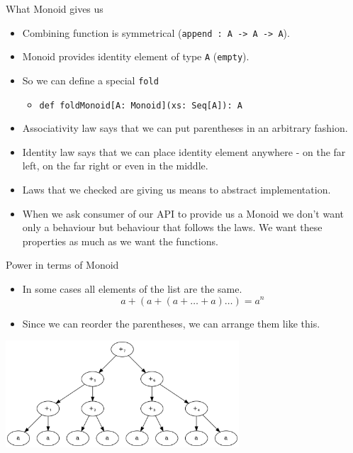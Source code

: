 \documentclass[presentation,aspectratio=169,smaller]{beamer}
\begin{document}
\begin{frame}[label={sec:org7111aef},fragile]{What Monoid gives us}
 \begin{itemize}
\item Combining function is symmetrical (\texttt{append : A -> A -> A}).
\item Monoid provides identity element of type \texttt{A} (\texttt{empty}).
\item So we can define a special \texttt{fold}
\begin{itemize}
\item \texttt{def foldMonoid[A: Monoid](xs: Seq[A]): A}
\end{itemize}
\item Associativity law says that we can put parentheses in an arbitrary fashion.
\item Identity law says that we can place identity element anywhere - on the far
left, on the far right or even in the middle.
\item Laws that we checked are giving us means to abstract implementation.
\item When we ask consumer of our API to provide us a Monoid we don't want only a
behaviour but behaviour that follows the \alert{laws}. We want these \alert{properties} as
much as we want the functions.
\end{itemize}
\end{frame}

\begin{frame}[label={sec:org8980c3a}]{Power in terms of Monoid}
\begin{itemize}
\item In some cases all elements of the list are the same.
\pause
\begin{equation*}
  a + (a + (a + \ldots + a) \ldots ) = a ^ n
\end{equation*}
\end{itemize}

\pause

\begin{itemize}
\item Since we can reorder the parentheses, we can arrange them like this.
\end{itemize}

\pause
\begin{center}
\includegraphics[height=4cm]{.dot/fold-power-1.png}
\end{center}
\end{frame}
\end{document}
